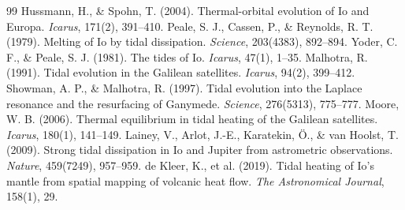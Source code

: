 \documentclass[11pt,a4paper]{article}
\begin{document}
\begin{thebibliography}{99}
 Hussmann, H., \& Spohn, T. (2004). Thermal-orbital evolution of Io and Europa. \textit{Icarus}, 171(2), 391--410.
 Peale, S. J., Cassen, P., \& Reynolds, R. T. (1979). Melting of Io by tidal dissipation. \textit{Science}, 203(4383), 892--894.
 Yoder, C. F., \& Peale, S. J. (1981). The tides of Io. \textit{Icarus}, 47(1), 1--35.
 Malhotra, R. (1991). Tidal evolution in the Galilean satellites. \textit{Icarus}, 94(2), 399--412.
 Showman, A. P., \& Malhotra, R. (1997). Tidal evolution into the Laplace resonance and the resurfacing of Ganymede. \textit{Science}, 276(5313), 775--777.
 Moore, W. B. (2006). Thermal equilibrium in tidal heating of the Galilean satellites. \textit{Icarus}, 180(1), 141--149.
 Lainey, V., Arlot, J.-E., Karatekin, {\"O}., \& van Hoolst, T. (2009). Strong tidal dissipation in Io and Jupiter from astrometric observations. \textit{Nature}, 459(7249), 957--959.
 de Kleer, K., et al. (2019). Tidal heating of Io's mantle from spatial mapping of volcanic heat flow. \textit{The Astronomical Journal}, 158(1), 29.
\end{thebibliography}

\appendix
\end{document}
